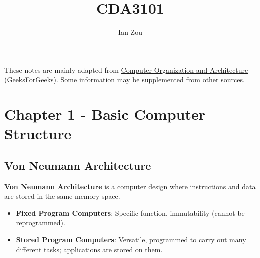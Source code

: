 \documentclass[12pt, letterpaper]{article}
\title{CDA3101}
\author{Ian Zou}
\begin{document}
\maketitle

These notes are mainly adapted from \href{https://www.geeksforgeeks.org/computer-organization-architecture/computer-organization-and-architecture-tutorials/}{Computer Organization and Architecture (GeeksForGeeks)}. Some information may be supplemented from other sources.

\section*{Chapter 1 - Basic Computer Structure}

\subsection*{Von Neumann Architecture}

\textbf{Von Neumann Architecture} is a computer design where instructions and data are stored in the same memory space.

\begin{itemize}
    \item \textbf{Fixed Program Computers}: Specific function, immutability (cannot be reprogrammed).
    \item \textbf{Stored Program Computers}: Versatile, programmed to carry out many different tasks; applications are stored on them.
\end{itemize}
\end{document}
